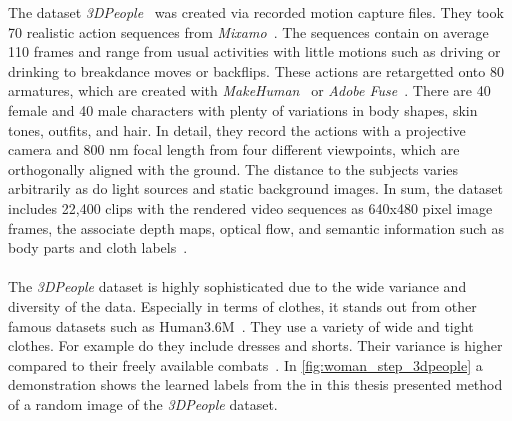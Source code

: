 The dataset \textit{3DPeople}~\cite{3dpeople} was created via recorded motion capture files.
They took 70 realistic action sequences from \textit{Mixamo}~\cite{mixamomotionpac}.
The sequences contain on average 110 frames and range from usual activities with little motions such as driving
or drinking to breakdance moves or backflips.
These actions are retargetted onto 80 armatures, which are created with \textit{MakeHuman}~\cite{makehuman} or \textit{Adobe
Fuse}~\cite{adobefuse}.
There are 40 female and 40 male characters with plenty of variations in body shapes, skin tones, outfits, and hair.
In detail, they record the actions with a projective camera and 800 nm focal length from four different viewpoints,
which are orthogonally aligned with the ground.
The distance to the subjects varies arbitrarily as do light sources and static background images.
In sum, the dataset includes 22,400 clips with the rendered video sequences as 640x480 pixel image frames, the associate
depth maps, optical flow, and semantic information such as body parts and cloth labels~\cite{3dpeople}.
\\\mbox{}\\
The \textit{3DPeople} dataset is highly sophisticated due to the wide variance and diversity of the data.
Especially in terms of clothes, it stands out from other famous datasets such as Human3.6M~\cite{humaneva}.
They use a variety of wide and tight clothes. For example do they include dresses and shorts.
Their variance is higher compared to their freely available combats~\cite{human36m, humaneva}.
In \autoref{fig:woman_step_3dpeople} a demonstration shows the learned labels from the in this thesis presented method
of a random image of the
\textit{3DPeople} dataset.




